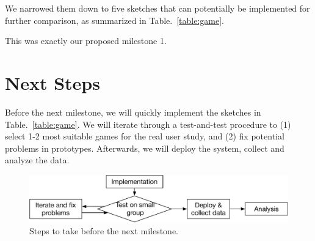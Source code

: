 \documentclass{article}
\begin{document}
We narrowed them down to five sketches that can potentially be implemented for further comparison, as summarized in Table.~\ref{table:game}.

This was exactly our proposed milestone 1.


\section{Next Steps}

Before the next milestone, we will quickly implement the sketches in Table.~\ref{table:game}. 
We will iterate through a test-and-test procedure to (1) select 1-2 most suitable games for the real user study, and (2) fix potential problems in prototypes. 
Afterwards, we will deploy the system, collect and analyze the data.

\begin{figure}[htb]
  \centering
	\includegraphics[width=0.75\columnwidth]{workflow}
  \vspace{-3mm}
  \caption{
	Steps to take before the next milestone.}
  \label{fig:workflow}  
  \vspace{-3mm}
\end{figure}

\end{document}
